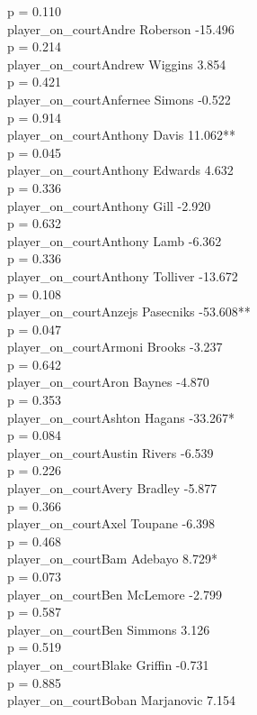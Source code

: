 \documentclass[
  landscape]{article}
\begin{document}
p = 0.110\\
player\_on\_courtAndre Roberson -15.496\\
p = 0.214\\
player\_on\_courtAndrew Wiggins 3.854\\
p = 0.421\\
player\_on\_courtAnfernee Simons -0.522\\
p = 0.914\\
player\_on\_courtAnthony Davis 11.062**\\
p = 0.045\\
player\_on\_courtAnthony Edwards 4.632\\
p = 0.336\\
player\_on\_courtAnthony Gill -2.920\\
p = 0.632\\
player\_on\_courtAnthony Lamb -6.362\\
p = 0.336\\
player\_on\_courtAnthony Tolliver -13.672\\
p = 0.108\\
player\_on\_courtAnzejs Pasecniks -53.608**\\
p = 0.047\\
player\_on\_courtArmoni Brooks -3.237\\
p = 0.642\\
player\_on\_courtAron Baynes -4.870\\
p = 0.353\\
player\_on\_courtAshton Hagans -33.267*\\
p = 0.084\\
player\_on\_courtAustin Rivers -6.539\\
p = 0.226\\
player\_on\_courtAvery Bradley -5.877\\
p = 0.366\\
player\_on\_courtAxel Toupane -6.398\\
p = 0.468\\
player\_on\_courtBam Adebayo 8.729*\\
p = 0.073\\
player\_on\_courtBen McLemore -2.799\\
p = 0.587\\
player\_on\_courtBen Simmons 3.126\\
p = 0.519\\
player\_on\_courtBlake Griffin -0.731\\
p = 0.885\\
player\_on\_courtBoban Marjanovic 7.154\\
\end{document}
